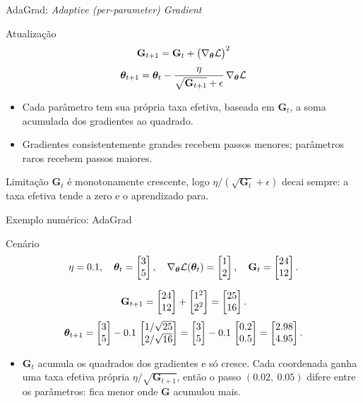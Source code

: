 \documentclass[aspectratio=169,xcolor=dvipsnames]{beamer}
\begin{document}
  \begin{frame}{AdaGrad: \textit{Adaptive (per-parameter) Gradient}}
    \begin{block}{Atualização}
      \[
        \mathbf{G}_{t+1} = \mathbf{G}_{t} + \big(\nabla_{\bm{\theta}}\mathcal{L}\big)^{2}
      \]
      \[
        \bm{\theta}_{t+1} = \bm{\theta}_{t} - \frac{\eta}{\sqrt{\mathbf{G}_{t+1}}+\epsilon}\,\nabla_{\bm{\theta}}\mathcal{L}
      \]
    \end{block}
    \begin{itemize}
      \item Cada parâmetro tem sua própria taxa efetiva, baseada em $\mathbf{G}_{t}$, a soma
        acumulada dos gradientes ao quadrado.
      \item Gradientes consistentemente grandes recebem passos menores; parâmetros
        raros recebem passos maiores.
    \end{itemize}
    \begin{alertblock}{Limitação}
      $\mathbf{G}_{t}$ é monotonamente crescente, logo $\eta/(\sqrt{\mathbf{G}_{t}}+\epsilon)$ decai sempre:
      a taxa efetiva tende a zero e o aprendizado para.
    \end{alertblock}
  \end{frame}

  \begin{frame}{Exemplo numérico: AdaGrad}
    \begin{block}{Cenário}
      \[
        \eta=0.1,\quad \bm{\theta}_t=\begin{bmatrix} 3 \\ 5 \end{bmatrix},\quad \nabla_{\bm{\theta}}\mathcal{L}(\bm{\theta}_t)=\begin{bmatrix} 1 \\ 2 \end{bmatrix},\quad \mathbf{G}_t=\begin{bmatrix} 24 \\ 12 \end{bmatrix}.
      \]
    \end{block}
    \[
      \mathbf{G}_{t+1} = \begin{bmatrix} 24 \\ 12 \end{bmatrix} + \begin{bmatrix} 1^2 \\ 2^2 \end{bmatrix} = \begin{bmatrix} 25 \\ 16 \end{bmatrix}.
    \]
    \[
      \bm{\theta}_{t+1} = \begin{bmatrix} 3 \\ 5 \end{bmatrix} - 0.1\,\begin{bmatrix} 1/\sqrt{25} \\ 2/\sqrt{16} \end{bmatrix}
      = \begin{bmatrix} 3 \\ 5 \end{bmatrix} - 0.1\,\begin{bmatrix} 0.2 \\ 0.5 \end{bmatrix} = \begin{bmatrix} 2.98 \\ 4.95 \end{bmatrix}.
    \]
    \begin{itemize}
      \item $\mathbf{G}_t$ acumula os quadrados dos gradientes e só cresce. Cada coordenada ganha uma taxa efetiva própria $\eta/\sqrt{\mathbf{G}_{t+1}}$, então o passo $(0.02,\ 0.05)$ difere entre os parâmetros: fica menor onde $\mathbf{G}$ acumulou mais.
    \end{itemize}
  \end{frame}
\end{document}
